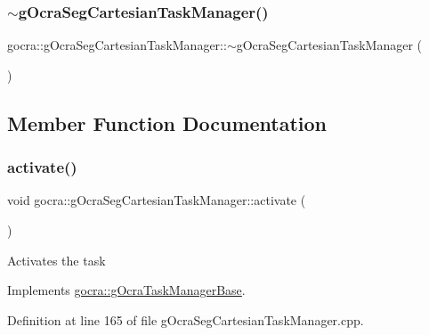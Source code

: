 \subsubsection{\texorpdfstring{$\sim$g\+Ocra\+Seg\+Cartesian\+Task\+Manager()}{~gOcraSegCartesianTaskManager()}}
{\footnotesize\ttfamily gocra\+::g\+Ocra\+Seg\+Cartesian\+Task\+Manager\+::$\sim$g\+Ocra\+Seg\+Cartesian\+Task\+Manager (\begin{DoxyParamCaption}{ }\end{DoxyParamCaption})}



\subsection{Member Function Documentation}
\hypertarget{classgocra_1_1gOcraSegCartesianTaskManager_ad10f6192fd628de724bd923770bd632e}{}\label{classgocra_1_1gOcraSegCartesianTaskManager_ad10f6192fd628de724bd923770bd632e} 
\subsubsection{\texorpdfstring{activate()}{activate()}}
{\footnotesize\ttfamily void gocra\+::g\+Ocra\+Seg\+Cartesian\+Task\+Manager\+::activate (\begin{DoxyParamCaption}{ }\end{DoxyParamCaption})\hspace{0.3cm}{\ttfamily [virtual]}}

Activates the task 

Implements \hyperlink{classgocra_1_1gOcraTaskManagerBase_a50cf1c408749d6e9dcfaf50bcab77dee}{gocra\+::g\+Ocra\+Task\+Manager\+Base}.



Definition at line 165 of file g\+Ocra\+Seg\+Cartesian\+Task\+Manager.\+cpp.

\hypertarget{classgocra_1_1gOcraSegCartesianTaskManager_a0d74a81a6ba05ccbd509aa3362ae59aa}{}\label{classgocra_1_1gOcraSegCartesianTaskManager_a0d74a81a6ba05ccbd509aa3362ae59aa} 
